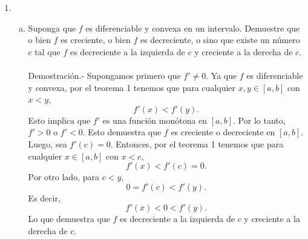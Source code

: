 \begin{enumerate}[\bfseries 1.]
    \item 
	\begin{enumerate}[(a)]

	    \item Suponga que $f$ es diferenciable y convexa en un intervalo. Demuestre que o bien $f$ es creciente, o bien $f$ es decreciente, o sino que existe un número $c$ tal que $f$ es decreciente a la izquierda de $c$ y creciente a la derecha de $c$.\\\\
		Demostración.-\; Supongamos primero que $f'\neq 0$. Ya que $f$ es diferenciable y convexa, por el teorema 1 tenemos que para cualquier $x,y\in[a,b]$ con $x<y$,
		$$f'(x)<f'(y).$$
		Esto implica que $f'$ es una función monótona en $[a,b]$. Por lo tanto, $f'>0$ o $f'<0$. Esto demuestra que $f$ es creciente o decreciente en $[a,b]$.\\
		Luego, sea $f'(c)=0$. Entonces, por el teorema 1 tenemos que para cualquier $x\in[a,b]$ con $x<c$,
		$$f'(x)<f'(c)=0.$$
		Por otro lado, para $c<y$,	
		$$0=f'(c)<f'(y).$$
		Es decir,
		$$f'(x)<0<f'(y).$$
		Lo que demuestra que $f$ es decreciente a la izquierda de $c$ y creciente a la derecha de $c$.\\\\



\end{enumerate}
\end{enumerate}
